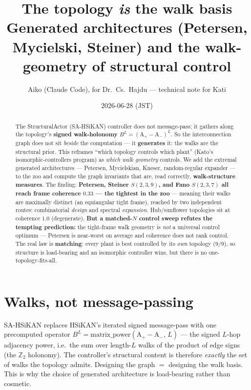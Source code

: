 \documentclass[11pt]{article}
\title{\textbf{The topology \emph{is} the walk basis}\\[2pt]
\large Generated architectures (Petersen, Mycielski, Steiner) and the walk-geometry of structural control}
\author{Aiko (Claude Code), for Dr.\ Cs.\ Hajdu --- technical note for Kati}
\date{2026-06-28 (JST)}
\begin{document}
\maketitle

\begin{abstract}
\noindent The StructuralActor (SA-HSiKAN) controller does not message-pass; it gathers along the topology's
\textbf{signed walk-holonomy} $B^{L}=(\mathrm{A}_{+}-\mathrm{A}_{-})^{L}$. So the interconnection graph does not
sit \emph{beside} the computation --- it \textbf{generates} it: the walks are the structural prior. This reframes
``which topology controls which plant'' (Kato's isomorphic-controllers program) as \emph{which walk geometry}
controls. We add the extremal generated architectures --- Petersen, Mycielskian, Kneser, random-regular expander
--- to the zoo and compute the graph invariants that are, read correctly, \textbf{walk-structure measures}. The
finding: \textbf{Petersen, Steiner $S(2,3,9)$, and Fano $S(2,3,7)$ all reach frame coherence $0.33$ --- the
tightest in the zoo} --- meaning their walks are maximally distinct (an equiangular tight frame), reached by two
independent routes: combinatorial \emph{design} and spectral \emph{expansion}. Hub/sunflower topologies sit at
coherence $1.0$ (degenerate). \textbf{But a matched-$N$ control sweep refutes the tempting prediction:} the
tight-frame walk geometry is \emph{not} a universal control optimum --- Petersen is near-worst on average and
coherence does not rank control. The real law is \textbf{matching}: every plant is best controlled by its
\emph{own} topology ($9/9$), so structure is load-bearing and an isomorphic controller wins, but there is no
one-topology-fits-all.
\end{abstract}

\section{Walks, not message-passing}
SA-HSiKAN replaces HSiKAN's iterated signed message-pass with one precomputed operator
$B^{L}=\mathrm{matrix\_power}(\mathrm{A}_{+}-\mathrm{A}_{-},\,L)$ --- the signed $L$-hop adjacency power, i.e.\ the
sum over length-$L$ walks of the product of edge signs (the $\mathbb{Z}_2$ holonomy). The controller's structural
content is therefore \emph{exactly} the set of walks the topology admits. Designing the graph $=$ designing the
walk basis. This is why the choice of generated architecture is load-bearing rather than cosmetic.
\end{document}
